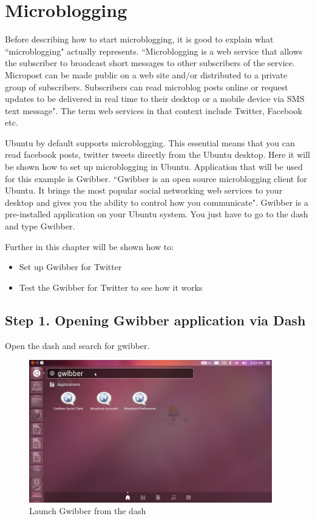 \section{Microblogging} 
Before describing how to start microblogging, it is good to explain what ``microblogging" actually represents. ``Microblogging is  a web service that allows the subscriber to broadcast short messages to other subscribers of the service. Micropost can be made public on a web site  and/or distributed to a private group of subscribers. Subscribers can read microblog posts online or request updates to be delivered in real time to their desktop or a mobile device via SMS text message". The term web services in that context include Twitter, Facebook etc. \\

\par \noindent Ubuntu by default supports microblogging. This essential means that you can read facebook posts, twitter tweets directly from the Ubuntu desktop. Here it will be shown how to set up microblogging in Ubuntu. Application that will be used for this example is Gwibber. ``Gwibber is an open source microblogging client for Ubuntu. It brings the most popular social networking web services to your desktop and gives you the ability to control how you communicate". Gwibber is a pre-installed application on your Ubuntu system. You just have to go to the dash and type Gwibber. \\

\par \noindent Further in this chapter will be shown how to: 

\begin{itemize}
		\item Set up Gwibber for Twitter
		\item Test the Gwibber for Twitter to see how it works
\end{itemize}

\subsection*{Step 1.  Opening Gwibber application via Dash}

\par \noindent Open the dash and search for gwibber. \\

\begin{figure}[h!]	
	\centering
	\includegraphics[width=300pt]{./images/basic-tasks/gwibber1.png}
	\caption{Launch Gwibber from the dash}	
	\label{fig:gwibber1}		
\end{figure}

